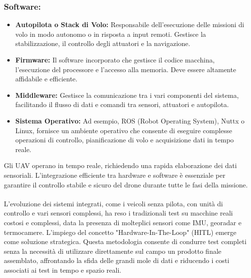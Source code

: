 \subsubsection*{Software:}
\begin{itemize}
    \item \textbf{Autopilota o Stack di Volo:} Responsabile dell'esecuzione delle missioni di volo in modo autonomo o in risposta a input remoti. Gestisce la stabilizzazione, il controllo degli attuatori e la navigazione.
    \item \textbf{Firmware:} Il software incorporato che gestisce il codice macchina, l'esecuzione del processore e l'accesso alla memoria. Deve essere altamente affidabile e efficiente.
    \item \textbf{Middleware:} Gestisce la comunicazione tra i vari componenti del sistema, facilitando il flusso di dati e comandi tra sensori, attuatori e autopilota.
    \item \textbf{Sistema Operativo:} Ad esempio, ROS (Robot Operating System), Nuttx o Linux, fornisce un ambiente operativo che consente di eseguire complesse operazioni di controllo, pianificazione di volo e acquisizione dati in tempo reale.
\end{itemize}
Gli UAV operano in tempo reale, richiedendo una rapida elaborazione dei dati sensoriali. L'integrazione efficiente tra hardware e software è essenziale per garantire il controllo stabile e sicuro del drone durante tutte le fasi della missione.
\\~\\
L'evoluzione dei sistemi integrati, come i veicoli senza pilota, con unità di controllo e vari sensori complessi, ha reso i tradizionali test su macchine reali costosi e complessi, data la presenza di molteplici sensori come IMU, georadar e termocamere. L'impiego del concetto "Hardware-In-The-Loop" (HITL) emerge come soluzione strategica. Questa metodologia consente di condurre test completi senza la necessità di utilizzare direttamente sul campo un prodotto finale assemblato, affrontando la sfida delle grandi mole di dati e riducendo i costi associati ai test in tempo e spazio reali.
